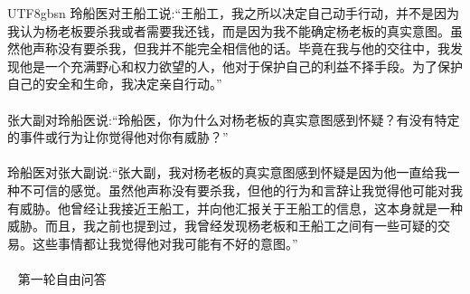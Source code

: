 \documentclass[11pt]{article}
\begin{document}
{\begin{CJK}{UTF8}{gbsn}
玲船医对王船工说:``王船工，我之所以决定自己动手行动，并不是因为我认为杨老板要杀我或者需要我还钱，而是因为我不能确定杨老板的真实意图。虽然他声称没有要杀我，但我并不能完全相信他的话。毕竟在我与他的交往中，我发现他是一个充满野心和权力欲望的人，他对于保护自己的利益不择手段。为了保护自己的安全和生命，我决定亲自行动。''\\ \\
张大副对玲船医说:``玲船医，你为什么对杨老板的真实意图感到怀疑？有没有特定的事件或行为让你觉得他对你有威胁？''\\ \\
玲船医对张大副说:``张大副，我对杨老板的真实意图感到怀疑是因为他一直给我一种不可信的感觉。虽然他声称没有要杀我，但他的行为和言辞让我觉得他可能对我有威胁。他曾经让我接近王船工，并向他汇报关于王船工的信息，这本身就是一种威胁。而且，我之前也提到过，我曾经发现杨老板和王船工之间有一些可疑的交易。这些事情都让我觉得他对我可能有不好的意图。''\\ \\


\ \raisedrule[.5ex]{1pt} 第一轮自由问答 \raisedrule[.5ex]{1pt} \ 


\end{CJK}}
\end{document}
